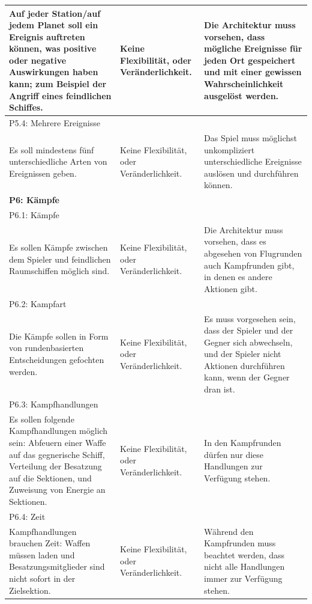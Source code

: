 \documentclass[fontsize=12pt,paper=a4,twoside]{scrartcl}
\begin{document}
\begin{longtable}[c]{|p{5cm}|p{5cm}|p{5cm}|}
\\ \hline
Auf jeder Station/auf jedem Planet soll ein Ereignis auftreten können, was positive oder negative Auswirkungen haben kann; zum Beispiel der Angriff eines feindlichen Schiffes.  & Keine Flexibilität, oder Veränderlichkeit.    &  Die Architektur muss vorsehen, dass mögliche Ereignisse für jeden Ort gespeichert und mit einer gewissen Wahrscheinlichkeit ausgelöst werden. 
\\ \hline
\multicolumn{3}{|l|}{{P5.4: Mehrere Ereignisse}} 
\\ \hline
Es soll mindestens fünf unterschiedliche Arten von Ereignissen geben. & Keine Flexibilität, oder Veränderlichkeit.    & Das Spiel muss möglichst unkompliziert unterschiedliche Ereignisse auslösen und durchführen können. 
\\ \hline
%
\multicolumn{3}{|l|}{{\textbf{P6: Kämpfe}}} 
\\ \hline
\multicolumn{3}{|l|}{{P6.1: Kämpfe}} 
\\ \hline
Es sollen Kämpfe zwischen dem Spieler und feindlichen Raumschiffen möglich sind. & Keine Flexibilität, oder Veränderlichkeit.    & Die Architektur muss vorsehen, dass es abgesehen von Flugrunden auch Kampfrunden gibt, in denen es andere Aktionen gibt.
\\ \hline
\multicolumn{3}{|l|}{{P6.2: Kampfart}} 
\\ \hline
Die Kämpfe sollen in Form von rundenbasierten Entscheidungen gefochten werden. & Keine Flexibilität, oder Veränderlichkeit.    &  Es muss vorgesehen sein, dass der Spieler und der Gegner sich abwechseln, und der Spieler nicht Aktionen durchführen kann, wenn der Gegner dran ist. 
\\ \hline
\multicolumn{3}{|l|}{{P6.3: Kampfhandlungen}} 
\\ \hline
Es sollen folgende Kampfhandlungen möglich sein: Abfeuern einer Waffe auf das gegnerische Schiff, Verteilung der Besatzung auf die Sektionen, und Zuweisung von Energie an Sektionen. & Keine Flexibilität, oder Veränderlichkeit.    &  In den Kampfrunden dürfen nur diese Handlungen zur Verfügung stehen.
\\ \hline
\multicolumn{3}{|l|}{{P6.4: Zeit}} 
\\ \hline
Kampfhandlungen brauchen Zeit: Waffen müssen laden und Besatzungsmitglieder sind nicht sofort in der Zielsektion. & Keine Flexibilität, oder Veränderlichkeit.    & Während den Kampfrunden muss beachtet werden, dass nicht alle Handlungen immer zur Verfügung stehen. 
\\ \hline

\end{longtable}
\end{document}
